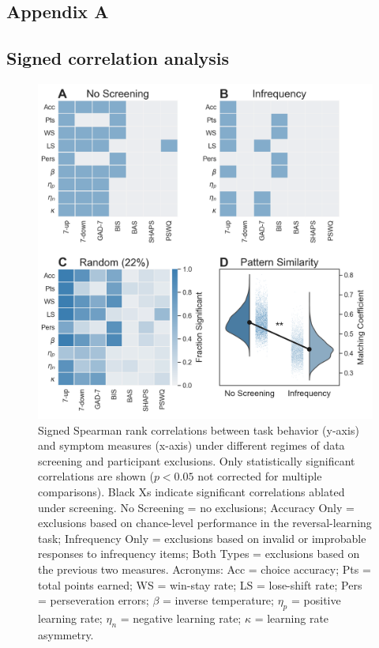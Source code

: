 \documentclass[a4paper,notitlepage,12pt]{article}
\begin{document}
\begin{refsection}[supp]
\section*{Appendix A}
\setcounter{figure}{0}
\setcounter{table}{0}
\renewcommand{\thetable}{S\arabic{table}}
\renewcommand{\thefigure}{S\arabic{figure}}

\subsection*{Signed correlation analysis}

\begin{figure}[H]
\includegraphics[width=17cm]{../figures/supp_01.png}
\centering
\captionsetup{width=0.88\textwidth}
\caption{Signed Spearman rank correlations between task behavior (y-axis) and symptom measures (x-axis) under different regimes of data screening and participant exclusions. Only statistically significant correlations are shown ($p<0.05$ not corrected for multiple comparisons). Black Xs indicate significant correlations ablated under screening. No Screening = no exclusions; Accuracy Only = exclusions based on chance-level performance in the reversal-learning task; Infrequency Only = exclusions based on invalid or improbable responses to infrequency items; Both Types = exclusions based on the previous two measures. Acronyms: Acc = choice accuracy; Pts = total points earned; WS = win-stay rate; LS = lose-shift rate; Pers = perseveration errors; $\beta$ = inverse temperature; $\eta_p$ = positive learning rate; $\eta_n$ = negative learning rate; $\kappa$ = learning rate asymmetry.}
\label{fig:correlations_s1}
\end{figure}


\end{refsection}
\end{document}
